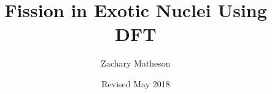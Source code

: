 \documentclass[a4paper,12pt]{book}
\begin{document}
\author{Zachary Matheson}
\title{Fission in Exotic Nuclei Using DFT}
\date{Revised May 2018}

\frontmatter
\maketitle
\tableofcontents

\mainmatter
\appendix

\backmatter


\end{document}
